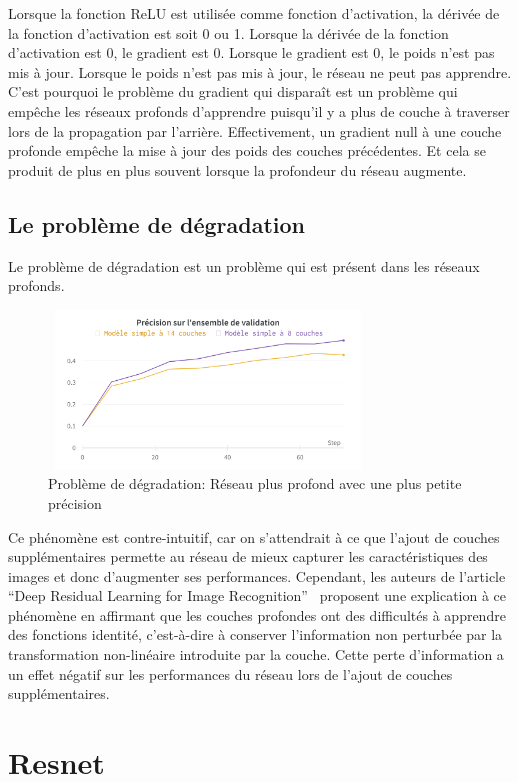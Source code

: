 \documentclass{article}
\begin{document}
Lorsque la fonction ReLU est utilisée comme fonction d'activation, la dérivée de la fonction d'activation est soit 0 ou 1.
Lorsque la dérivée de la fonction d'activation est 0, le gradient est 0.
Lorsque le gradient est 0, le poids n'est pas mis à jour.
Lorsque le poids n'est pas mis à jour, le réseau ne peut pas apprendre.
C'est pourquoi le problème du gradient qui disparaît est un problème qui empêche les réseaux profonds d'apprendre puisqu'il y a plus
de couche à traverser lors de la propagation par l'arrière. Effectivement, un gradient null à une couche profonde empêche
la mise à jour des poids des couches précédentes. Et cela se produit de plus en plus souvent lorsque la profondeur du réseau augmente.

\subsection{Le problème de dégradation}
Le problème de dégradation est un problème qui est présent dans les réseaux profonds.

\begin{figure}[h]
    \centering
    \includegraphics[width=240pt,height=120pt]{./img/degradation}
    \caption{Problème de dégradation: Réseau plus profond avec une plus petite précision}\label{fig: degrad}
\end{figure}

Ce phénomène est contre-intuitif, car on s'attendrait à ce que l'ajout de couches supplémentaires permette au réseau de mieux
capturer les caractéristiques des images et donc d'augmenter ses performances.
Cependant, les auteurs de l'article ``Deep Residual Learning for Image Recognition''~\cite{resnet}
proposent une explication à ce phénomène
en affirmant que les couches profondes ont des difficultés à apprendre des fonctions identité,
c'est-à-dire à conserver l'information non perturbée par la transformation non-linéaire introduite par la couche.
Cette perte d'information a un effet négatif sur les performances du réseau lors de l'ajout de couches supplémentaires.

\section{Resnet}
\end{document}
